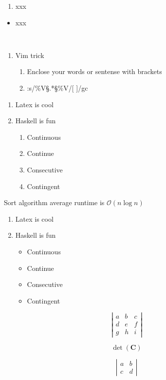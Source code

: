 \documentclass{article}
\begin{document}
 
\begin{enumerate}
\item xxx
\end{enumerate} 

\begin{itemize}
\item xxx
\end{itemize} 
\mathbf
\textbf
\mathbf
\mathbf
\mathbf
\
\mathbf{A} 
\mathbb{}
\mathbf

\begin{enumerate}
    \item Vim trick 
    \begin{enumerate}
        \item Enclose your words or sentense with brackets 
        \item :s/\%V\S.*\S\%V/[ \0 ]/gc 
    \end{enumerate}
\end{enumerate}

\begin{enumerate}
    \item Latex is cool
    \item Haskell is fun 
    \begin{enumerate}
    \item Continuous 
    \item Continue 
    \item Consecutive 
    \item Contingent 
    \end{enumerate} 
\end{enumerate} 
\m\mathbf{}
\m\mathbf{}
\m\math
\m\math
\m\math
\m\math
\m\math
\m\math
\mathbf
\mathbf
\mathbf 
\textbf
\textbf
\mathbf

\mQuick Sort algorithm average runtime is $\mathcal{O}(n\log{}n)$
\begin{enumerate}
    \item Latex is cool
    \item Haskell is fun 
    \begin{itemize}
    \item Continuous 
    \item Continue 
    \item Consecutive 
    \item Contingent 
    \end{itemize} 
\end{enumerate} 
\mathbb{} 
\m\mathbf{}

\[      
    \left| \begin{array}{ccc}
    a & b & c \\
    d & e & f \\
    g & h & i \end{array} \right| 
\]
 

\[  \det (\mathbf{C})   \]

\[ \left| \begin{array}{cc}
a & b \\
c & d \end{array} \right| \] 
\end{document}
